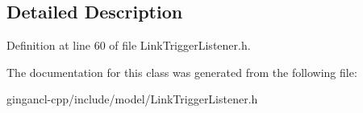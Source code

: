 \subsection{Detailed Description}




Definition at line 60 of file LinkTriggerListener.h.

The documentation for this class was generated from the following file:\begin{CompactItemize}
\item 
gingancl-cpp/include/model/LinkTriggerListener.h\end{CompactItemize}

